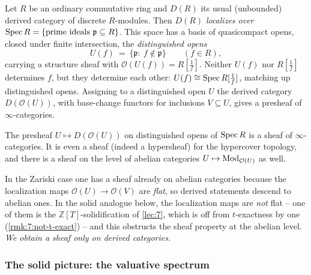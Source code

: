 \begin{remark}
\label{rmk:9:spec-analogy}
Let $R$ be an ordinary commutative ring and $D(R)$ its usual (unbounded)
derived category of discrete $R$-modules. Then $D(R)$ \emph{localizes over}
$\operatorname{Spec} R=\{\text{prime ideals }\mathfrak p\subseteq R\}$. This space has a basis
of quasicompact opens, closed under finite intersection, the
\emph{distinguished opens}
\begin{equation*}
U(f)\ =\ \{\mathfrak p:\ f\notin\mathfrak p\}\qquad(f\in R),
\end{equation*}
carrying a structure sheaf with $\mathcal O(U(f))=R[\tfrac1f]$. Neither $U(f)$
nor $R[\tfrac1f]$ determines $f$, but they determine each other:
$U(f)\cong\operatorname{Spec} R[\tfrac1f]$, matching up distinguished opens. Assigning to a
distinguished open $U$ the derived category $D(\mathcal O(U))$, with base-change
functors for inclusions $V\subseteq U$, gives a presheaf of $\infty$-categories.
\end{remark}

\begin{theorem}
\label{thm:9:zariski-sheaf}
The presheaf $U\mapsto D(\mathcal O(U))$ on distinguished opens of $\operatorname{Spec} R$ is a
sheaf of $\infty$-categories. It is even a sheaf (indeed a hypersheaf) for the
hypercover topology, and there is a sheaf on the level of abelian categories
$U\mapsto\operatorname{Mod}_{\mathcal O(U)}$ as well.
\end{theorem}

\begin{remark}
\label{rmk:9:no-abelian-sheaf}
In the Zariski case one has a sheaf already on abelian categories because the
localization maps $\mathcal O(U)\to\mathcal O(V)$ are \emph{flat}, so derived
statements descend to abelian ones. In the solid analogue below, the
localization maps are \emph{not} flat -- one of them is the
$\mathbb{Z}[T]$-solidification of \cref{lec:7}, which is off from $t$-exactness
by one (\cref{rmk:7:not-t-exact}) -- and this obstructs the sheaf property at
the abelian level. \emph{We obtain a sheaf only on derived categories.}
\end{remark}

\subsubsection*{The solid picture: the valuative spectrum}

